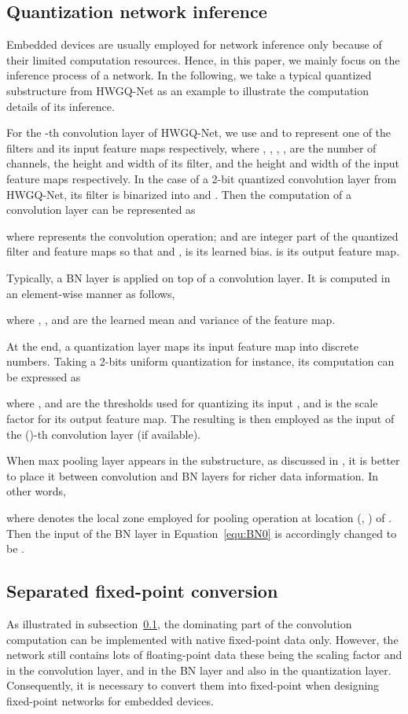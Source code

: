 \documentclass[10pt,twocolumn,letterpaper]{article}
\begin{document}
\subsection{Quantization network inference}\label{subSec:QCNNInfere}
Embedded devices are usually employed for network inference only because of their limited computation resources. Hence, in this paper, we mainly focus on the inference process of a network. In the following, we take a typical quantized substructure from HWGQ-Net as an example to illustrate the computation details of its inference.



For the -th convolution layer of HWGQ-Net, we use  and  to represent one of the filters and its input feature maps respectively, where , , , ,  are the number of channels, the height and width of its filter, and the height and width of the input feature maps respectively. In the case of a 2-bit quantized convolution layer from HWGQ-Net, its filter is binarized into  and . Then the computation of a convolution layer can be represented as



where  represents the convolution operation;  and  are integer part of the quantized filter and feature maps so that  and ,  is its learned bias. is its output feature map. 



Typically, a BN layer is applied on top of a convolution layer. It is computed in an element-wise manner as follows,

where , ,  and  are the learned mean and variance of the feature map.

At the end, a quantization layer maps its input feature map  into discrete numbers. Taking a 2-bits uniform quantization for instance, its computation can be expressed as

where ,  and  are the thresholds used for quantizing its input , and  is the scale factor for its output feature map. The resulting  is then employed as the input of the ()-th convolution layer (if available).

When max pooling layer appears in the substructure, as discussed in \cite{XNOR}, it is better to place it between convolution and BN layers for richer data information. In other words,

where  denotes the local zone employed for pooling operation at location (, ) of . Then the input of the BN layer in Equation~\ref{equ:BN0} is accordingly changed to be  .

\subsection{Separated fixed-point conversion} \label{sec:sepConv}
As illustrated in subsection~\ref{subSec:QCNNInfere}, the dominating part of the convolution computation  can be implemented with native fixed-point data only. However, the network still contains lots of floating-point data these being the scaling factor  and  in the convolution layer,  and  in the BN layer and also  in the quantization layer. Consequently, it is necessary to convert them into fixed-point when designing fixed-point networks for embedded devices.
\end{document}
